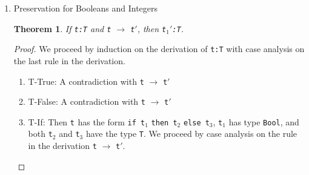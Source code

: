 \documentclass{article}
\newcommand{\step}[2]{{\tt #1} $\longrightarrow$ {\tt #2}}
\newcommand{\term}[1]{{\tt t$_{#1}$}}
\newtheorem{theorem}{Theorem}
\begin{document}
\begin{enumerate}
\begin{proof}
\begin{enumerate}
        \item T-GT: \term{} is \term{1} \verb|>| \term{2}. \term{1} and \term{2} have the type \verb|Int|. By the inductive hypothesis either \term{1} is a value or there exists some \term{1}$'$ such that \step{t$_1$}{\term{1}$'$}. We proceed by case analysis on the form of \term{1}.
          \begin{enumerate}
            \item Value: If \term{1} is a value then, by its type \verb|Int|, we know that it must be an integer \verb|n| and either E-Plus2 or E-PlusRed may apply to \term{}. By the inductive hypothesis \term{2} is either a value, in which case E-PlusRed applies and \term{} steps to \verb|n|$_1$ $[[>]]$ \verb|n|$_2$, or \term{2} can take a step to \term{2}$'$, E-Plus2 applies, and \term{} steps to \verb|v|$_1$ \verb|+| \term{2}$'$.
            \item Steps to \term{1}$'$: If \term{1} can step then E-Plus1 applies and \term{} steps to \term{1}$'$ \verb|>| \term{2}.
          \end{enumerate}
        \end{enumerate}
    \end{proof}

\newpage
  \item Preservation for Booleans and Integers

    \begin{theorem}
      If \verb|t:T| and \verb|t| $\longrightarrow$ \verb|t|$'$, then \term{1}$'$\verb|:T|.
    \end{theorem}

    \begin{proof}
      We proceed by induction on the derivation of \verb|t:T| with case analysis on the last rule in the derivation.
      \begin{enumerate}
        \item T-True: A contradiction with \verb|t| $\longrightarrow$ \verb|t|$'$
        \item T-False: A contradiction with \verb|t| $\longrightarrow$ \verb|t|$'$
        \item T-If: Then \term{} has the form \verb|if t|$_1$ \verb|then t|$_2$ \verb|else t|$_3$, \term{1} has type \verb|Bool|, and both \term{2} and \term{3} have the type \verb|T|. We proceed by case analysis on the rule in the derivation \verb|t| $\longrightarrow$ \verb|t|$'$.
      \end{enumerate}
    \end{proof}

\end{enumerate}
\end{document}
